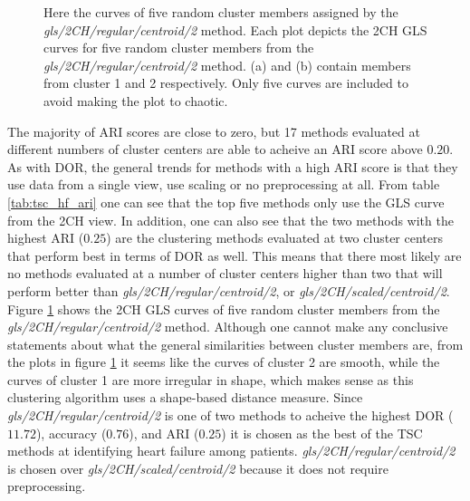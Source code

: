 \begin{figure}[htb]
    \centering
    
    \caption{Here the curves of five random cluster members assigned by the \textit{gls/2CH/regular/centroid/2} method.
             Each plot depicts the 2CH GLS curves for five random cluster members from the \textit{gls/2CH/regular/centroid/2} method. 
             (a) and (b) contain members from cluster 1 and 2 respectively. Only five curves are included to avoid making the plot to chaotic.}
    \label{fig:tsc_hf_best_meth_5_samples}
\end{figure}

\newpage

The majority of ARI scores are close to zero, but 17 methods evaluated at different numbers of cluster centers are able to acheive an ARI score above $0.20$.
As with DOR, the general trends for methods with a high ARI score is that they use data from a single view, use scaling or no preprocessing at all.
From table \ref{tab:tsc_hf_ari} one can see that the top five methods only use the GLS curve from the 2CH view. 
In addition, one can also see that the two methods with the highest ARI ($0.25$) are the clustering methods evaluated at two cluster centers that perform best in terms of DOR as well. 
This means that there most likely are no methods evaluated at a number of cluster centers higher than two 
that will perform better than \textit{gls/2CH/regular/centroid/2}, or \textit{gls/2CH/scaled/centroid/2}.
Figure \ref{fig:tsc_hf_best_meth_5_samples} shows the 2CH GLS curves of five random cluster members from the \textit{gls/2CH/regular/centroid/2} method.
Although one cannot make any conclusive statements about what the general similarities between cluster members are, from the plots in figure \ref{fig:tsc_hf_best_meth_5_samples}
it seems like the curves of cluster 2 are smooth, while the curves of cluster 1 are more irregular in shape, which makes sense as this clustering algorithm uses a shape-based distance measure.
Since \textit{gls/2CH/regular/centroid/2} is one of two methods to acheive the highest DOR ($11.72$), accuracy ($0.76$), and ARI ($0.25$) it is chosen as the best of the TSC methods
at identifying heart failure among patients. \textit{gls/2CH/regular/centroid/2} is chosen over \textit{gls/2CH/scaled/centroid/2} because it does not require preprocessing.
\bigskip

